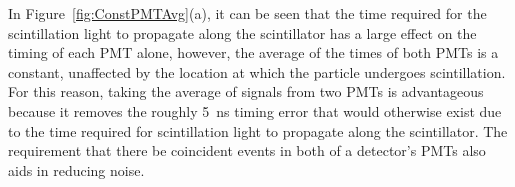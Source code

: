In Figure~\ref{fig:ConstPMTAvg}(a), it can be seen that the time required for the scintillation light to propagate along the scintillator has a large effect on the timing of each PMT alone, however, the average of the times of both PMTs is a constant, unaffected by the location at which the particle undergoes scintillation.
For this reason, taking the average of signals from two PMTs is advantageous because it removes the roughly 5~ns timing error that would otherwise exist due to the time required for scintillation light to propagate along the scintillator.
The requirement that there be coincident events in both of a detector's PMTs also aids in reducing noise.
\begin{figure}[h]
\centering
{}


\end{figure}
